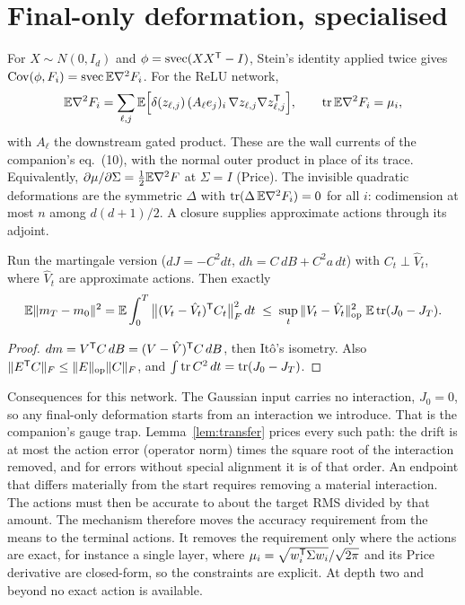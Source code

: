 \section{Final-only deformation, specialised}

\begin{proposition}\label{prop:price}
For $X\sim N(0,I_d)$ and $\phi=\operatorname{svec}(XX^{\mathsf T}-I)$, Stein's identity applied twice gives
$\operatorname{Cov}(\phi,F_i)=\operatorname{svec}\mathbb{E}\nabla^2F_i$. For the ReLU network,
\[
\mathbb{E}\nabla^2F_i=\sum_{\ell,j}\mathbb{E}\Big[\delta(z_{\ell,j})\,(A_\ell e_j)_i\,\nabla z_{\ell,j}\nabla z_{\ell,j}^{\mathsf T}\Big],
\qquad \operatorname{tr}\mathbb{E}\nabla^2F_i=\mu_i,
\]
with $A_\ell$ the downstream gated product. These are the wall currents of the companion's eq.~(10), with the normal
outer product in place of its trace. Equivalently, $\partial\mu/\partial\Sigma=\frac12\mathbb{E}\nabla^2F$ at $\Sigma=I$ (Price).
The invisible quadratic deformations are the symmetric $\Delta$ with $\operatorname{tr}(\Delta\,\mathbb{E}\nabla^2F_i)=0$ for all $i$: codimension
at most $n$ among $d(d+1)/2$. A closure supplies approximate actions through its adjoint.
\end{proposition}

\begin{lemma}\label{lem:transfer}
Run the martingale version ($dJ=-C^2dt$, $dh=C\,dB+C^2a\,dt$) with $C_t\perp\hat V_t$, where $\hat V_t$ are approximate
actions. Then exactly
\[
\mathbb{E}\|m_T-m_0\|^2=\mathbb{E}\int_0^T\big\|(V_t-\hat V_t)^{\mathsf T} C_t\big\|_F^2\,dt\;\le\;\sup_t\|V_t-\hat V_t\|_{\rm op}^2\;\mathbb{E}\operatorname{tr}(J_0-J_T).
\]
\end{lemma}
\begin{proof}
$dm=V^{\mathsf T} C\,dB=(V-\hat V)^{\mathsf T} C\,dB$, then It\^o's isometry. Also $\|E^{\mathsf T} C\|_F\le\|E\|_{\rm op}\|C\|_F$, and
$\int\operatorname{tr} C^2\,dt=\operatorname{tr}(J_0-J_T)$.
\end{proof}

Consequences for this network. The Gaussian input carries no interaction, $J_0=0$, so any final-only deformation
starts from an interaction we introduce. That is the companion's gauge trap. Lemma~\ref{lem:transfer} prices every such
path: the drift is at most the action error (operator norm) times the square root of the interaction removed, and for
errors without special alignment it is of that order. An endpoint that differs materially from the start requires removing a material interaction. The
actions must then be accurate to about the target RMS divided by that amount. The mechanism therefore moves the accuracy
requirement from the means to the terminal actions. It removes the requirement only where the actions are exact, for
instance a single layer, where $\mu_i=\sqrt{w_i^{\mathsf T}\Sigma w_i}/\sqrt{2\pi}$ and its Price derivative are closed-form, so the
constraints are explicit. At depth two and beyond no exact action is available.

